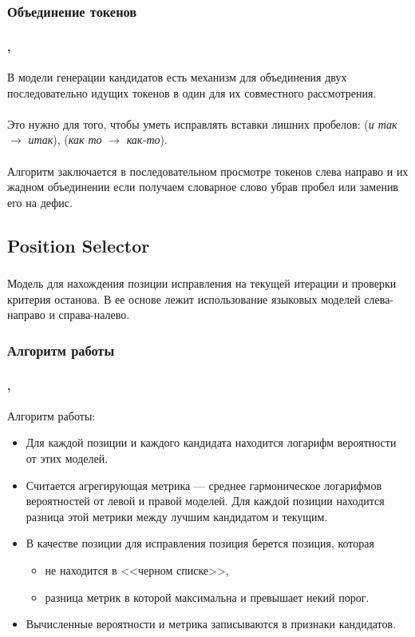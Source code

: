 \documentclass[t]{beamer}  %
\begin{document}
\subsubsection{Объединение токенов}
\begin{frame}
	\frametitle{\insertsection} 
	\framesubtitle{\insertsubsection, \insertsubsubsection}
	В модели генерации кандидатов есть механизм для объединения двух последовательно идущих токенов в один для их совместного рассмотрения. \\~\\
	
	Это нужно для того, чтобы уметь исправлять вставки лишних пробелов: (\textit{и так} $\rightarrow$ \textit{итак}), (\textit{как то} $\rightarrow$ \textit{как-то}). \\~\\
	
	Алгоритм заключается в последовательном просмотре токенов слева направо и их жадном объединении если получаем словарное слово убрав пробел или заменив его на дефис.
	
\end{frame}

\subsection{Position Selector}
\begin{frame}
	\frametitle{\insertsection} 
	\framesubtitle{\insertsubsection}
	Модель для нахождения позиции исправления на текущей итерации и проверки критерия останова. В ее основе лежит использование языковых моделей слева-направо и справа-налево.
\end{frame}

\subsubsection{Алгоритм работы}
\begin{frame}
	\frametitle{\insertsection} 
	\framesubtitle{\insertsubsection, \insertsubsubsection}
	Алгоритм работы:
	\begin{itemize}
		\item  Для каждой позиции и каждого кандидата находится логарифм вероятности от этих моделей.
		\item Считается агрегирующая метрика --- среднее гармоническое логарифмов вероятностей от левой и правой моделей. Для каждой позиции находится разница этой метрики между лучшим кандидатом и текущим.
		\item В качестве позиции для исправления позиция берется позиция, которая
		\begin{itemize}
			\item не находится в <<черном списке>>,
			\item разница метрик в которой максимальна и превышает некий порог.
		\end{itemize}
		\item Вычисленные вероятности и метрика записываются в признаки кандидатов.
	\end{itemize}
\end{frame}
\end{document}
